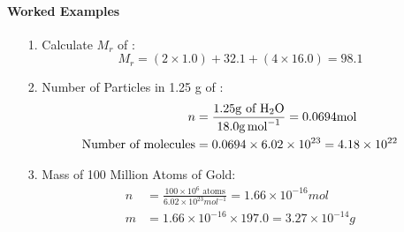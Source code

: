 \paragraph{Worked Examples}
\begin{itemize}
    \item[1.] Calculate $M_r$ of :
    \begin{equation}
        M_r = (2 \times 1.0) + 32.1 + (4 \times 16.0) = 98.1
    \end{equation}
    \item[2.] Number of Particles in 1.25 \unit{g} of :
    \begin{equation}
        \begin{split}
            n &= \frac{1.25 \unit{g} \text{ of } \ce{H2O}}{18.0 \unit{g.mol^{-1}}} = 0.0694 \unit{mol}\\
            \text{Number of molecules} &= 0.0694 \times 6.02 \times 10^{23} = 4.18 \times 10^{22}
        \end{split}
    \end{equation}
    \item[3.] Mass of 100 Million Atoms of Gold:
    \begin{equation}
        \begin{split}
            n &= \frac{100 \times 10^6 \text{ atoms}}{6.02 \times 10^{23} \unit{mol^{-1}}} = 1.66 \times 10^{-16} \unit{mol}\\
            m &= 1.66 \times 10^{-16} \times 197.0 = 3.27 \times 10^{-14} \unit{g}
        \end{split}
    \end{equation}
\end{itemize}